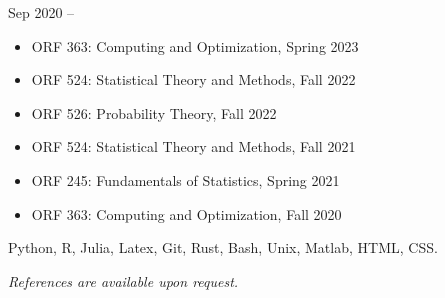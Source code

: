\documentclass[
  date,
  number,
]{wgu-cv}
\begin{document}

{}
{Sep 2020 --}

\begin{itemize}

  \item
    ORF 363:
    Computing and Optimization,
    Spring 2023

  \item
    ORF 524:
    Statistical Theory and Methods,
    Fall 2022

  \item
    ORF 526:
    Probability Theory,
    Fall 2022

  \item
    ORF 524:
    Statistical Theory and Methods,
    Fall 2021

  \item
    ORF 245:
    Fundamentals of Statistics,
    Spring 2021

  \item
    ORF 363:
    Computing and Optimization,
    Fall 2020

\end{itemize}


Python,
R,
Julia,
Latex,
Git,
Rust,
Bash,
Unix,
Matlab,
HTML,
CSS.


\emph{References are available upon request.}

\end{document}
